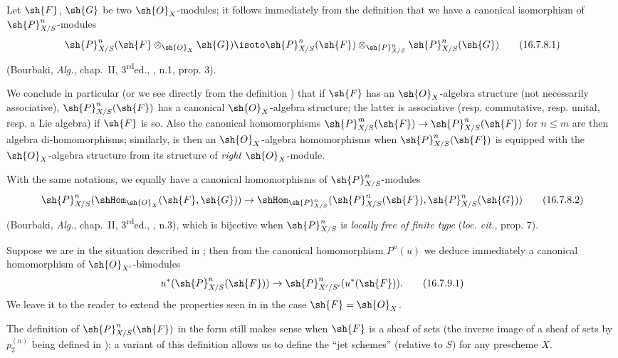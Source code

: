 \begin{env}[16.7.8]
\label{IV.16.7.8}
Let $\sh{F}$, $\sh{G}$ be two $\sh{O}_X$-modules;
it follows immediately from the definition  that we have a canonical isomorphism of $\sh{P}_{X/S}^n$-modules
\[
  \label{IV.16.7.8.1}
  \sh{P}_{X/S}^n(\sh{F} \otimes_{\sh{O}_X} \sh{G}) \isoto \sh{P}_{X/S}^n(\sh{F}) \otimes_{\sh{P}_{X/S}^n} \sh{P}_{X/S}^n(\sh{G})
  \tag{16.7.8.1}
\]
(Bourbaki, \emph{Alg.}, chap.~II, 3\textsuperscript{rd}ed., , n.1, prop. 3).

We conclude in particular (or we see directly from the definition ) that if $\sh{F}$ has an $\sh{O}_X$-algebra structure (not necessarily associative), $\sh{P}_{X/S}^n(\sh{F})$ has a canonical $\sh{O}_X$-algebra structure;
the latter is associative (resp. commutative, resp. unital, resp. a Lie algebra) if $\sh{F}$ is so.
Also the canonical homomorphisms $\sh{P}_{X/S}^m(\sh{F}) \to \sh{P}_{X/S}^n(\sh{F})$ for $n \leq m$  are then algebra di-homomorphisms;
similarly,  is then an $\sh{O}_X$-algebra homomorphisms when $\sh{P}_{X/S}^n(\sh{F})$ is equipped with the $\sh{O}_X$-algebra structure from its structure of \emph{right} $\sh{O}_X$-module.

With the same notations, we equally have a canonical homomorphisms of $\sh{P}_{X/S}^n$-modules
\[
  \label{IV.16.7.8.2}
  \sh{P}_{X/S}^n(\shHom_{\sh{O}_X}(\sh{F}, \sh{G})) \to \shHom_{\sh{P}_{X/S}^n}(\sh{P}_{X/S}^n(\sh{F}), \sh{P}_{X/S}^n(\sh{G}))
  \tag{16.7.8.2}
\]
(Bourbaki, \emph{Alg.}, chap.~II, 3\textsuperscript{rd}ed., , n.3), which is bijective when $\sh{P}_{X/S}^n$ is \emph{locally free of finite type} (\emph{loc. cit.}, prop. 7).
\end{env}

\begin{env}[16.7.9]
\label{IV.16.7.9}
Suppose we are in the situation described in ;
then from the canonical homomorphism $P^n(u)$  we deduce immediately a canonical homomorphism of $\sh{O}_{X'}$-bimodules 
\[
  \label{IV.16.7.9.1}
  u^*(\sh{P}_{X/S}^n(\sh{F})) \to \sh{P}_{X'/S'}^n(u^*(\sh{F})).
  \tag{16.7.9.1}
\]
We leave it to the reader to extend the properties seen in  in the case $\sh{F} = \sh{O}_X$.
\end{env}

\begin{remark}[16.7.10]
\label{IV.16.7.10}
The definition of $\sh{P}_{X/S}^n(\sh{F})$ in the form  still makes sense when $\sh{F}$ is a sheaf of sets (the inverse image of a sheaf of sets by $p_2^{(n)}$ being defined in );
a variant of this definition allows us to define the ``jet schemes'' (relative to $S$) for any prescheme $X$.
\end{remark}


